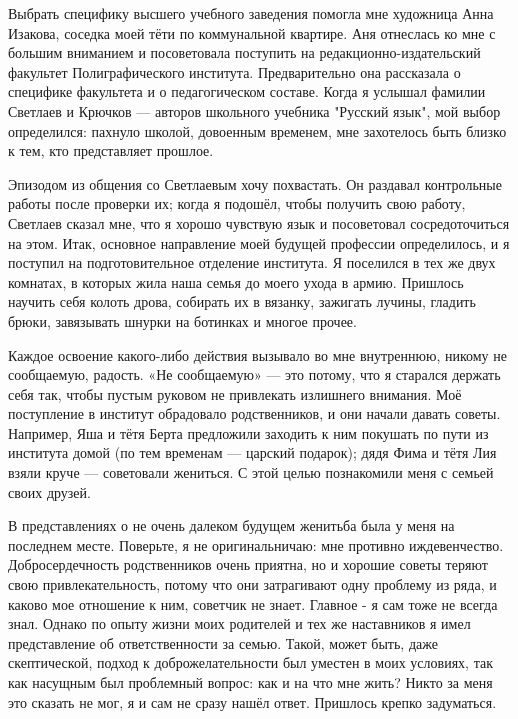 \label{272-1}
Выбрать специфику высшего учебного заведения помогла мне художница Анна Изакова, соседка моей тёти по коммунальной квартире. Аня отнеслась ко мне с большим вниманием и посоветовала поступить на редакционно-издательский факультет Полиграфического института. Предварительно она рассказала о специфике факультета и о педагогическом составе. Когда я услышал фамилии Светлаев и Крючков — авторов школьного учебника "Русский язык", мой выбор определился: пахнуло школой, довоенным временем, мне захотелось быть близко к тем, кто представляет прошлое.

\label{273-1}
Эпизодом из общения со Светлаевым хочу похвастать. Он раздавал контрольные работы после проверки их; когда я подошёл, чтобы получить свою работу, Светлаев сказал мне, что я хорошо чувствую язык и посоветовал сосредоточиться на этом. Итак, основное направление моей будущей профессии определилось, и я поступил на подготовительное отделение института. Я поселился в тех же двух комнатах, в которых жила наша семья до моего ухода в армию. Пришлось научить себя колоть дрова, собирать их в вязанку, зажигать лучины, гладить брюки, завязывать шнурки на ботинках и многое прочее.

\label{274-1}
Каждое освоение какого-либо действия вызывало во мне внутреннюю, никому не сообщаемую, радость. «Не сообщаемую» — это потому, что я старался держать себя так, чтобы пустым руковом не привлекать излишнего внимания. Моё поступление в институт обрадовало родственников, и они начали давать советы. Например, Яша и тётя Берта предложили заходить к ним покушать по пути из института домой (по тем временам — царский подарок); дядя Фима и тётя Лия взяли круче — советовали жениться. С этой целью познакомили меня с семьей своих друзей.

\label{275-1}
В представлениях о не очень далеком будущем женитьба была у меня на последнем месте. Поверьте, я не оригинальничаю: мне противно иждевенчество. Добросердечность родственников очень приятна, но и хорошие советы теряют свою привлекательность, потому что они затрагивают одну проблему из ряда, и каково мое отношение к ним, советчик не знает. Главное - я сам тоже не всегда знал. Однако по опыту жизни моих родителей и тех же наставников я имел представление об ответственности за семью. Такой, может быть, даже скептической, подход к доброжелательности был уместен в моих условиях, так как насущным был проблемный вопрос: как и на что мне жить? Никто за меня это сказать не мог, я и сам не сразу нашёл ответ. Пришлось крепко задуматься.



